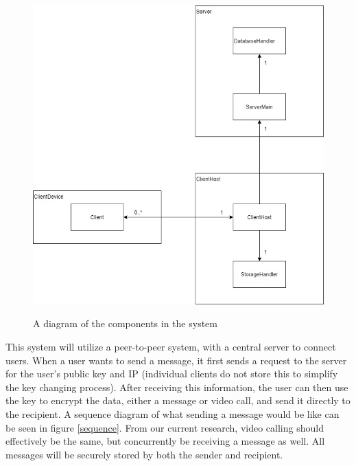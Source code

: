 \documentclass[titlepage]{article}
\begin{document}
      \begin{center}
          \begin{figure}[!ht]
              \includegraphics[scale=.5]{graphics/arch.png}
              \label{componenets}
              \caption{A diagram of the components in the system}
          \end{figure}
      \end{center}

      This system will utilize a peer-to-peer system, with a central server to connect users.
      When a user wants to send a message, it first sends a request to the server for the user's public key and IP (individual clients do not store this to simplify the key changing process).
      After receiving this information, the user can then use the key to encrypt the data, either a message or video call, and send it directly to the recipient.
      A sequence diagram of what sending a message would be like can be seen in figure \ref{sequence}.
      From our current research, video calling should effectively be the same, but concurrently be receiving a message as well.
      All messages will be securely stored by both the sender and recipient.
\end{document}
